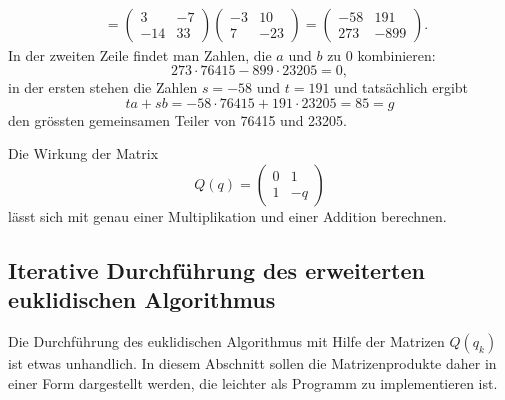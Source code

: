 \begin{beispiel}
\begin{align*}
{}_{}
\\ &=
\begin{pmatrix}  3 &  -7 \\ -14 &  33 \end{pmatrix}
\begin{pmatrix} -3 &  10 \\   7 & -23 \end{pmatrix}
=
\begin{pmatrix} -58 & 191 \\ 273 & -899 \end{pmatrix}.
\end{align*}
In der zweiten Zeile findet man Zahlen, die $a$ und $b$ zu 0 kombinieren:
\[
273 \cdot 76415 - 899 \cdot 23205 = 0,
\]
in der ersten stehen die Zahlen $s=-58$ und $t=191$ und tatsächlich
ergibt
\[
ta+sb = -58\cdot 76415  + 191\cdot 23205 = 85 = g
\]
den grössten gemeinsamen Teiler von 76415 und 23205.
\end{beispiel}

Die Wirkung der Matrix
\[
Q(q) = \begin{pmatrix} 0 & 1 \\ 1 & -q \end{pmatrix}
\]
lässt sich mit genau einer Multiplikation und einer Addition
berechnen.

%
%
\subsection{Iterative Durchführung des erweiterten euklidischen Algorithmus
\label{buch:endlichekoerper:subsection:matrixschreibweise}}
Die Durchführung des euklidischen Algorithmus mit Hilfe der Matrizen
$Q(q_k)$ ist etwas unhandlich.
In diesem Abschnitt sollen die Matrizenprodukte daher in einer Form
dargestellt werden, die leichter als Programm zu implementieren ist.

